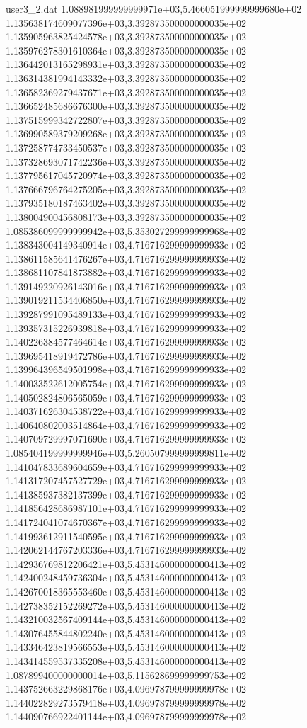 \begin{filecontents}{user3_2.dat}
1.088981999999999971e+03,5.466051999999999680e+02
1.135638174609077396e+03,3.392873500000000035e+02
1.135905963825424578e+03,3.392873500000000035e+02
1.135976278301610364e+03,3.392873500000000035e+02
1.136442013165298931e+03,3.392873500000000035e+02
1.136314381994143332e+03,3.392873500000000035e+02
1.136582369279437671e+03,3.392873500000000035e+02
1.136652485686676300e+03,3.392873500000000035e+02
1.137515999342722807e+03,3.392873500000000035e+02
1.136990589379209268e+03,3.392873500000000035e+02
1.137258774733450537e+03,3.392873500000000035e+02
1.137328693071742236e+03,3.392873500000000035e+02
1.137795617045720974e+03,3.392873500000000035e+02
1.137666796764275205e+03,3.392873500000000035e+02
1.137935180187463402e+03,3.392873500000000035e+02
1.138004900456808173e+03,3.392873500000000035e+02
1.085386099999999942e+03,5.353027299999999968e+02
1.138343004149340914e+03,4.716716299999999933e+02
1.138611585641476267e+03,4.716716299999999933e+02
1.138681107841873882e+03,4.716716299999999933e+02
1.139149220926143016e+03,4.716716299999999933e+02
1.139019211534406850e+03,4.716716299999999933e+02
1.139287991095489133e+03,4.716716299999999933e+02
1.139357315226939818e+03,4.716716299999999933e+02
1.140226384577464614e+03,4.716716299999999933e+02
1.139695418919472786e+03,4.716716299999999933e+02
1.139964396549501998e+03,4.716716299999999933e+02
1.140033522612005754e+03,4.716716299999999933e+02
1.140502824806565059e+03,4.716716299999999933e+02
1.140371626304538722e+03,4.716716299999999933e+02
1.140640802003514864e+03,4.716716299999999933e+02
1.140709729997071690e+03,4.716716299999999933e+02
1.085404199999999946e+03,5.260507999999999811e+02
1.141047833689604659e+03,4.716716299999999933e+02
1.141317207457527729e+03,4.716716299999999933e+02
1.141385937382137399e+03,4.716716299999999933e+02
1.141856428686987101e+03,4.716716299999999933e+02
1.141724041074670367e+03,4.716716299999999933e+02
1.141993612911540595e+03,4.716716299999999933e+02
1.142062144767203336e+03,4.716716299999999933e+02
1.142936769812206421e+03,5.453146000000000413e+02
1.142400248459736304e+03,5.453146000000000413e+02
1.142670018365553460e+03,5.453146000000000413e+02
1.142738352152269272e+03,5.453146000000000413e+02
1.143210032567409144e+03,5.453146000000000413e+02
1.143076455844802240e+03,5.453146000000000413e+02
1.143346423819566553e+03,5.453146000000000413e+02
1.143414559537335208e+03,5.453146000000000413e+02
1.087899400000000014e+03,5.115628699999999753e+02
1.143752663229868176e+03,4.096978799999999978e+02
1.144022829273579418e+03,4.096978799999999978e+02
1.144090766922401144e+03,4.096978799999999978e+02

\end{filecontents}

